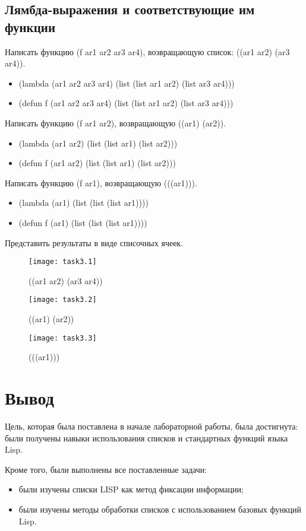 \documentclass[a4paper, 14pt, unknownkeysallowed]{extreport}
\begin{document}
\section{Лямбда-выражения и соответствующие им функции}
Написать функцию (f ar1 ar2 ar3 ar4), возвращающую список: ((ar1 ar2) (ar3 ar4)).
	\begin{itemize}
		\item (lambda (ar1 ar2 ar3 ar4) (list (list ar1 ar2) (list ar3 ar4)))
		\item (defun f (ar1 ar2 ar3 ar4) (list (list ar1 ar2) (list ar3 ar4)))
	\end{itemize}
Написать функцию (f ar1 ar2), возвращающую ((ar1) (ar2)).
	\begin{itemize}
		\item (lambda (ar1 ar2) (list (list ar1) (list ar2)))
		\item (defun f (ar1 ar2) (list (list ar1) (list ar2)))
	\end{itemize}
Написать функцию (f ar1), возвращающую (((ar1))).
	\begin{itemize}
		\item (lambda (ar1) (list (list (list ar1))))
		\item (defun f (ar1) (list (list (list ar1))))
	\end{itemize}
Представить результаты в виде списочных ячеек.

\begin{figure}[!ht]
	\texttt{[image: task3.1]}
	\caption{((ar1 ar2) (ar3 ar4))}
\end{figure}
\begin{figure}[!ht]
	\texttt{[image: task3.2]}
	\caption{((ar1) (ar2))}
\end{figure}
\begin{figure}[!ht]
	\texttt{[image: task3.3]}
	\caption{(((ar1)))}
\end{figure}

\chapter*{Вывод}
Цель, которая была поставлена в начале лабораторной работы, была достигнута: были получены навыки использования списков и стандартных функций языка Lisp. 

Кроме того, были выполнены все поставленные задачи:
\begin{itemize}
	\item были изучены списки LISP как метод фиксации информации;
	\item были изучены методы обработки списков с использованием	базовых функций Lisp.
\end{itemize}
\end{document}
